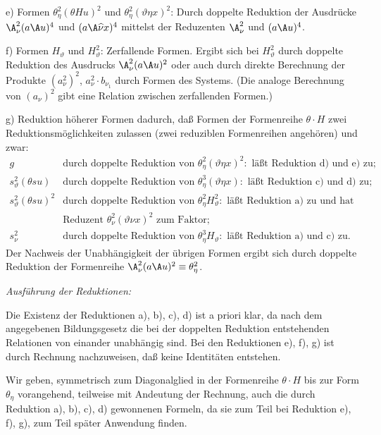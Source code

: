 e) Formen $\theta_\eta^2(\theta Hu)^2$ und $\theta_\eta^2(\vartheta\eta x)^2$: Durch doppelte Reduktion der Ausdrücke $\A_\nu^2(a\A u)^4$ und $(a\A\widehat{\nu}x)^4$ mittelst der Reduzenten $\A_\nu^2$ und $(a\A u)^4$.

f) Formen $H_\vartheta$ und $H_\vartheta^2$: Zerfallende Formen. Ergibt sich bei $H_\vartheta^2$ durch doppelte Reduktion des Ausdrucks $\A_\nu^2(a\A u)^2$ oder auch durch direkte Berechnung der Produkte $(a_\nu^2)^2$, $a_\nu^2\cdot b_{\nu_1}$ durch Formen des Systems. (Die analoge Berechnung von $(a_\nu)^2$ gibt eine Relation zwischen zerfallenden Formen.)

g) Reduktion höherer Formen dadurch, daß Formen der Formenreihe $\theta\cdot H$ zwei Reduktionsmöglichkeiten zulassen (zwei reduziblen Formenreihen angehören) und zwar:
\[
\begin{array}{rl}
g&\text{durch doppelte Reduktion von }\theta_\eta^2(\vartheta\eta x)^2:\text{ läßt Reduktion d) und e) zu;}\\[0.3em]
s_\vartheta^2(\theta s u)&\text{durch doppelte Reduktion von }\theta_\eta^3(\vartheta\eta x):\text{ läßt Reduktion c) und d) zu;}\\[0.3em]
s_\vartheta^2(\theta s u)^2&\text{durch doppelte Reduktion von }\theta_\eta^2H_\vartheta^2:\text{ läßt Reduktion a) zu und hat}\\
&\text{Reduzent }\theta_\nu^2(\vartheta\nu x)^2\text{ zum Faktor;}\\[0.3em]
s_\nu^2&\text{durch doppelte Reduktion von }\theta_\eta^3H_\vartheta:\text{ läßt Reduktion a) und c) zu.}
\end{array}
\]
Der Nachweis der Unabhängigkeit der übrigen Formen ergibt sich durch doppelte Reduktion der Formenreihe $\A_\nu^2(a\A u)^2\equiv\theta_\eta^2$.

\noindent\emph{Ausführung der Reduktionen:}

Die Existenz der Reduktionen a), b), c), d) ist a priori klar, da nach dem angegebenen Bildungsgesetz die bei der doppelten Reduktion entstehenden Relationen von einander unabhängig sind. Bei den Reduktionen e), f), g) ist durch Rechnung nachzuweisen, daß keine Identitäten entstehen.

Wir geben, symmetrisch zum Diagonalglied in der Formenreihe $\theta\cdot H$ bis zur Form $\theta_\eta$ vorangehend, teilweise mit Andeutung der Rechnung, auch die durch Reduktion a), b), c), d) gewonnenen Formeln, da sie zum Teil bei Reduktion e), f), g), zum Teil später Anwendung finden.

